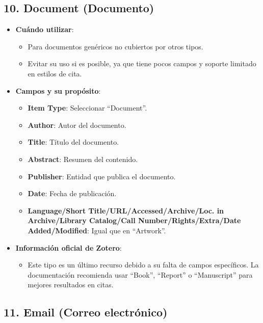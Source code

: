 \documentclass[
  jou,
  floatsintext,
  longtable,
  a4paper,
  nolmodern,
  notxfonts,
  notimes,
  colorlinks=true,linkcolor=blue,citecolor=blue,urlcolor=blue]{apa7}
\providecommand{\tightlist}{%
  \setlength{\itemsep}{0pt}\setlength{\parskip}{0pt}}
\begin{document}
\subsection{10. Document (Documento)}\label{document-documento}

\begin{itemize}
\tightlist
\item
  \textbf{Cuándo utilizar}:

  \begin{itemize}
  \tightlist
  \item
    Para documentos genéricos no cubiertos por otros tipos.
  \item
    Evitar su uso si es posible, ya que tiene pocos campos y soporte
    limitado en estilos de cita.
  \end{itemize}
\item
  \textbf{Campos y su propósito}:

  \begin{itemize}
  \tightlist
  \item
    \textbf{Item Type}: Seleccionar ``Document''.
  \item
    \textbf{Author}: Autor del documento.
  \item
    \textbf{Title}: Título del documento.
  \item
    \textbf{Abstract}: Resumen del contenido.
  \item
    \textbf{Publisher}: Entidad que publica el documento.
  \item
    \textbf{Date}: Fecha de publicación.
  \item
    \textbf{Language/Short Title/URL/Accessed/Archive/Loc. in
    Archive/Library Catalog/Call Number/Rights/Extra/Date
    Added/Modified}: Igual que en ``Artwork''.
  \end{itemize}
\item
  \textbf{Información oficial de Zotero}:

  \begin{itemize}
  \tightlist
  \item
    Este tipo es un último recurso debido a su falta de campos
    específicos. La documentación recomienda usar ``Book'', ``Report'' o
    ``Manuscript'' para mejores resultados en citas.
  \end{itemize}
\end{itemize}

\subsection{11. Email (Correo
electrónico)}\label{email-correo-electruxf3nico}
\end{document}
